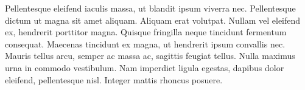 Pellentesque eleifend iaculis massa, ut blandit ipsum viverra nec. Pellentesque dictum ut magna sit amet aliquam. Aliquam erat volutpat. Nullam vel eleifend ex, hendrerit porttitor magna. Quisque fringilla neque tincidunt fermentum consequat. Maecenas tincidunt ex magna, ut hendrerit ipsum convallis nec. Mauris tellus arcu, semper ac massa ac, sagittis feugiat tellus. Nulla maximus urna in commodo vestibulum. Nam imperdiet ligula egestas, dapibus dolor eleifend, pellentesque nisl. Integer mattis rhoncus posuere.